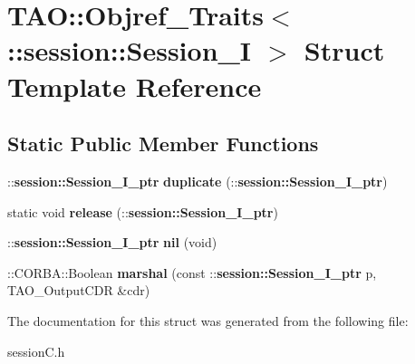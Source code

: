 \section{T\+AO\+:\+:Objref\+\_\+\+Traits$<$ \+:\+:session\+:\+:Session\+\_\+I $>$ Struct Template Reference}
\label{structTAO_1_1Objref__Traits_3_01_1_1session_1_1Session__I_01_4}
\subsection*{Static Public Member Functions}
\begin{DoxyCompactItemize}
\item 
\+::{\bf session\+::\+Session\+\_\+\+I\+\_\+ptr} {\bfseries duplicate} (\+::{\bf session\+::\+Session\+\_\+\+I\+\_\+ptr})\label{structTAO_1_1Objref__Traits_3_01_1_1session_1_1Session__I_01_4_afe9da36b3c89215dcdae12fa5a10dd6d}

\item 
static void {\bfseries release} (\+::{\bf session\+::\+Session\+\_\+\+I\+\_\+ptr})\label{structTAO_1_1Objref__Traits_3_01_1_1session_1_1Session__I_01_4_a63631406c57e9cc56c95d7aa45e1609d}

\item 
\+::{\bf session\+::\+Session\+\_\+\+I\+\_\+ptr} {\bfseries nil} (void)\label{structTAO_1_1Objref__Traits_3_01_1_1session_1_1Session__I_01_4_aa761ddbf8b9886035177912e49132183}

\item 
\+::C\+O\+R\+B\+A\+::\+Boolean {\bfseries marshal} (const \+::{\bf session\+::\+Session\+\_\+\+I\+\_\+ptr} p, T\+A\+O\+\_\+\+Output\+C\+DR \&cdr)\label{structTAO_1_1Objref__Traits_3_01_1_1session_1_1Session__I_01_4_a0a37cef95f18de97ed6e3391e399353e}

\end{DoxyCompactItemize}


The documentation for this struct was generated from the following file\+:\begin{DoxyCompactItemize}
\item 
session\+C.\+h\end{DoxyCompactItemize}
